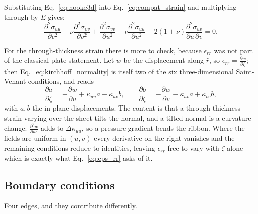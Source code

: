 \documentclass[11pt]{article}
\begin{document}
Substituting Eq.~\eqref{eq:hooke3d} into Eq.~\eqref{eq:compat_strain} and
multiplying through by $E$ gives:
\begin{equation}\label{eq:compat_stress}
    \boxed{\;
    \frac{\partial^{2} \bar\sigma_{uu}}{\partial v^{2}}
    - \nu\frac{\partial^{2} \bar\sigma_{vv}}{\partial v^{2}}
    + \frac{\partial^{2} \bar\sigma_{vv}}{\partial u^{2}}
    - \nu\frac{\partial^{2} \bar\sigma_{uu}}{\partial u^{2}}
    - 2\left(1+\nu\right)
      \frac{\partial^{2} \bar\sigma_{uv}}{\partial u\,\partial v} = 0.\;}
\end{equation}

For the through-thickness strain there is more to check, because
$\epsilon_{rr}$ was not part of the classical plate statement. Let $w$ be the
displacement along $\hat r$, so $\epsilon_{rr} = \frac{\partial w}
{\partial \zeta}$; then Eq.~\eqref{eq:kirchhoff_normality} is itself two of the
six three-dimensional Saint-Venant conditions, and reads
\begin{equation}\label{eq:normality_compat}
    \frac{\partial a}{\partial \zeta} = -\frac{\partial w}{\partial u}
      + \kappa_{uu}a - \kappa_{uv}b,
    \qquad
    \frac{\partial b}{\partial \zeta} = -\frac{\partial w}{\partial v}
      - \kappa_{uv}a + \kappa_{vv}b,
\end{equation}
with $a, b$ the in-plane displacements. The content is that a through-thickness
strain varying over the sheet tilts the normal, and a tilted normal is a
curvature change: $\frac{\partial^{2} w}{\partial u^{2}}$ adds to
$\Delta\kappa_{uu}$, so a pressure gradient bends the ribbon. Where the fields
are uniform in $(u,v)$ every derivative on the right vanishes and the remaining
conditions reduce to identities, leaving $\epsilon_{rr}$ free to vary with
$\zeta$ alone --- which is exactly what Eq.~\eqref{eq:eps_rr} asks of it.

\subsection{Boundary conditions}\label{sec:bcs}
Four edges, and they contribute differently.
\end{document}
